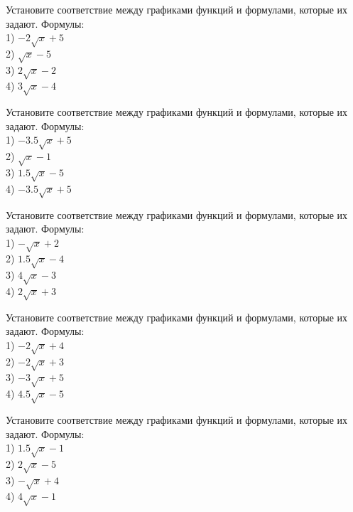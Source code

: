 \documentclass[4apaper]{article}
\begin{document}
\begin{taskBN}{16}
Установите соответствие между графиками функций и формулами, которые их задают. Формулы: \\1) $-2\sqrt{x}+5$\\2) $\sqrt{x}-5$\\3) $2\sqrt{x}-2$\\4) $3\sqrt{x}-4$
\end{taskBN}

\begin{taskBN}{17}
Установите соответствие между графиками функций и формулами, которые их задают. Формулы: \\1) $-3.5\sqrt{x}+5$\\2) $\sqrt{x}-1$\\3) $1.5\sqrt{x}-5$\\4) $-3.5\sqrt{x}+5$
\end{taskBN}

\begin{taskBN}{18}
Установите соответствие между графиками функций и формулами, которые их задают. Формулы: \\1) $-\sqrt{x}+2$\\2) $1.5\sqrt{x}-4$\\3) $4\sqrt{x}-3$\\4) $2\sqrt{x}+3$
\end{taskBN}

\begin{taskBN}{19}
Установите соответствие между графиками функций и формулами, которые их задают. Формулы: \\1) $-2\sqrt{x}+4$\\2) $-2\sqrt{x}+3$\\3) $-3\sqrt{x}+5$\\4) $4.5\sqrt{x}-5$
\end{taskBN}

\begin{taskBN}{20}
Установите соответствие между графиками функций и формулами, которые их задают. Формулы: \\1) $1.5\sqrt{x}-1$\\2) $2\sqrt{x}-5$\\3) $-\sqrt{x}+4$\\4) $4\sqrt{x}-1$
\end{taskBN}
\end{document}
